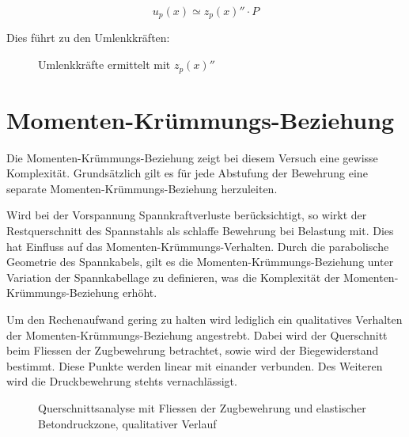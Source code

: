 \documentclass[
  11pt,
  letterpaper,
]{scrreprt}
\begin{document}
\[
u_p(x) \simeq z_p(x)'' \cdot P
\]

Dies führt zu den Umlenkkräften:

\begin{figure}[H]


\caption{\label{fig-u_p_von_x}Umlenkkräfte ermittelt mit \(z_p(x)''\)}

\end{figure}%

\section{Momenten-Krümmungs-Beziehung}\label{momenten-kruxfcmmungs-beziehung}

Die Momenten-Krümmungs-Beziehung zeigt bei diesem Versuch eine gewisse
Komplexität. Grundsätzlich gilt es für jede Abstufung der Bewehrung eine
separate Momenten-Krümmungs-Beziehung herzuleiten.

Wird bei der Vorspannung Spannkraftverluste berücksichtigt, so wirkt der
Restquerschnitt des Spannstahls als schlaffe Bewehrung bei Belastung
mit. Dies hat Einfluss auf das Momenten-Krümmungs-Verhalten. Durch die
parabolische Geometrie des Spannkabels, gilt es die
Momenten-Krümmungs-Beziehung unter Variation der Spannkabellage zu
definieren, was die Komplexität der Momenten-Krümmungs-Beziehung erhöht.

Um den Rechenaufwand gering zu halten wird lediglich ein qualitatives
Verhalten der Momenten-Krümmungs-Beziehung angestrebt. Dabei wird der
Querschnitt beim Fliessen der Zugbewehrung betrachtet, sowie wird der
Biegewiderstand bestimmt. Diese Punkte werden linear mit einander
verbunden. Des Weiteren wird die Druckbewehrung stehts vernachlässigt.

\begin{figure}[H]


\caption{\label{fig-qs_fliessen_qualitativ}Querschnittsanalyse mit
Fliessen der Zugbewehrung und elastischer Betondruckzone, qualitativer
Verlauf}

\end{figure}%
\end{document}
